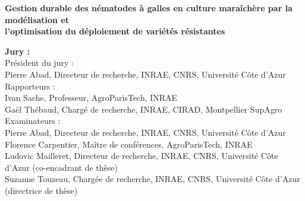 

\begin{titlepage}
	


		

\begin{center}

{\LARGE \bfseries  Gestion durable des nématodes à galles 
en culture maraîchère par la modélisation et  \\
l’optimisation du déploiement de variétés
 résistantes  \\[-0.15cm] }

\end{center}

\vfill

		\begin{minipage}[t]{1\linewidth} 
		
 {\large  \bfseries Jury : }\\
 
Président du jury : \\
Pierre Abad, Directeur de recherche, INRAE, CNRS, Université Côte d'Azur \\
 
Rapporteurs :\\
Ivan Sache, Professeur, AgroParisTech, INRAE \\
Gaël Thébaud, Chargé de recherche, INRAE, CIRAD, Montpellier SupAgro \\

Examinateurs :\\
Pierre Abad, Directeur de recherche, INRAE, CNRS, Université Côte d'Azur \\
Florence Carpentier, Maître de conférences, AgroParisTech, INRAE\\
Ludovic Mailleret, Directeur de recherche, INRAE, CNRS, Université Côte d'Azur (co-encadrant de thèse)\\
Suzanne Touzeau, Chargée de recherche, INRAE, CNRS, Université Côte d'Azur (directrice de thèse)\\


\end{minipage}
\end{titlepage}
